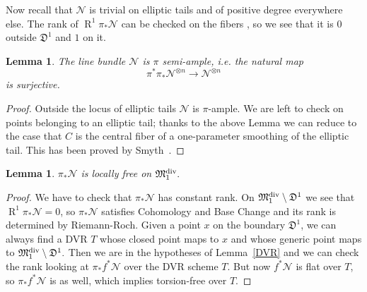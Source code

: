 \documentclass[11pt]{amsart}
\renewcommand{\to}{\rightarrow}
\newcommand{\MM}{\mathfrak M}
\newcommand{\R}{\operatorname{R}}
\theoremstyle{plain}
\newtheorem{lem}[thm]{Lemma}
\theoremstyle{definition}
\begin{document}
Now recall that $\mathcal N$ is trivial on elliptic tails and of positive degree everywhere else. The rank of $\R^1\pi_*\mathcal N$ can be checked on the fibers \cite[Theorem III.12.11]{HAR}, so we see that it is $0$ outside $\mathfrak D^1$ and $1$ on it.

\begin{lem}\label{lemma:semiample}
The line bundle $\mathcal N$ is $\pi$ semi-ample, i.e. the natural map
\[\pi^*\pi_*\mathcal N^{\otimes n}\to \mathcal N^{\otimes n}\]
is surjective.
\end{lem}
\begin{proof}
Outside the locus of elliptic tails $\mathcal N$ is $\pi$-ample. We are left to check on points belonging to an elliptic tail; thanks to the above Lemma we can reduce to the case that $C$ is the central fiber of a one-parameter smoothing of the elliptic tail. This has been proved by Smyth~\cite[Lemma~2.12]{SMY1}.
\end{proof}

\begin{lem}
$\pi_*\mathcal N$ is locally free on $\MM_1^{\rm{div}}.$
\end{lem}
\begin{proof}\cite[Proposition~3.7.2.1]{RSPW}
We have to check that $\pi_*\mathcal N$ has constant rank.
On $\MM_1^{\rm{div}}\setminus \mathfrak{D}^1$ we see that $\R^1\pi_*\mathcal N=0$, so $\pi_*\mathcal N$ satisfies Cohomology and Base Change and its rank is determined by Riemann-Roch.
Given a point $x$ on the boundary $\mathfrak{D}^1$, we can always find a DVR $T$ whose closed point maps to $x$ and whose generic point maps to $\MM_1^{\rm{div}}\setminus \mathfrak{D}^1.$ Then we are in the hypotheses of Lemma~\ref{DVR} and we can check the rank looking at $\pi_*f^*\mathcal N$ over the DVR scheme $T.$ But now $f^*\mathcal N$ is flat over $T$, so $\pi_*f^*\mathcal N$ is as well, which implies torsion-free over $T$.
\end{proof}
\end{document}
